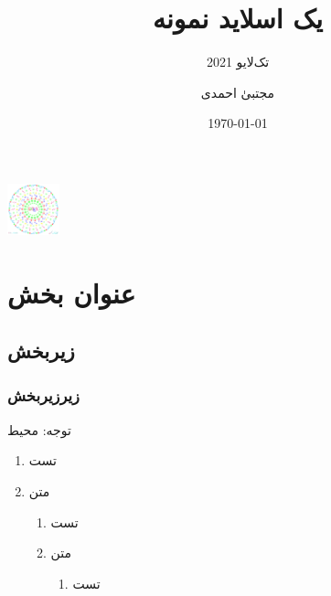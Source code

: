 \documentclass{beamer}
\title{یک اسلاید نمونه}
\subtitle{تک‌لایو 2021}
\author{مجتبیٰ احمدی}
\institute[پیام‌نو‌ر مشگین شهر]{دانشگاه: پیام‌نو‌ر مشگین شهر}
\date{\today}
\begin{document}
\begin{frame}
\centerline{\includegraphics[width=1.5cm]{logo1.png}}
\baselineskip
\titlepage
\end{frame}

\begin{frame}
\tableofcontents
\end{frame}

\section{عنوان بخش}
\subsection{زیربخش}
\subsubsection{زیرزیربخش}
\begin{frame}
 توجه: محیط
\begin{enumerate}\raggedleft
\item 
تست
\item 
متن
\begin{enumerate}\raggedleft
\item 
تست
\item 
متن
\begin{enumerate}\raggedleft
\item 
تست
\end{enumerate}
\end{enumerate}
\end{enumerate}

\end{frame}
\end{document}
